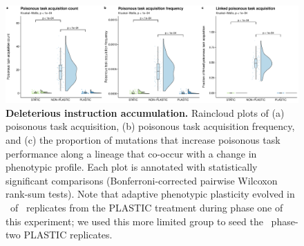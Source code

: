 \begin{figure}[ht!]
    \centering
    \includegraphics[width=1.0\textwidth]{media/poison-accumulation-panel.pdf}
    \caption{\small
    \textbf{Deleterious instruction accumulation.}
    Raincloud plots of 
    (a) poisonous task acquisition,
    (b) poisonous task acquisition frequency,
    and (c) the proportion of mutations that increase poisonous task performance along a lineage that co-occur with a change in phenotypic profile.
    Each plot is annotated with statistically significant comparisons (Bonferroni-corrected pairwise Wilcoxon rank-sum tests).
    Note that adaptive phenotypic plasticity evolved in \deleteriousHitchhikingPlasticReps\ of \deleteriousHitchhikingReplicates\ replicates from the PLASTIC treatment during phase one of this experiment; we used this more limited group to seed the \deleteriousHitchhikingPlasticReps\ phase-two PLASTIC replicates.
    }
    \label{fig:deleterious-hitchhiking}
\end{figure}
